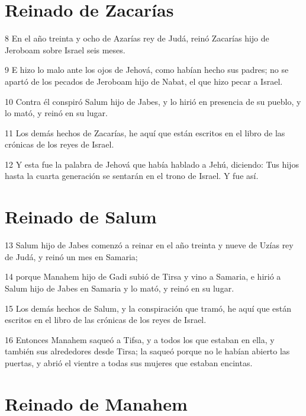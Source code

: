 \section*{Reinado de Zacarías}

\par 8 En el año treinta y ocho de Azarías rey de Judá, reinó Zacarías hijo de Jeroboam sobre Israel seis meses.
\par 9 E hizo lo malo ante los ojos de Jehová, como habían hecho sus padres; no se apartó de los pecados de Jeroboam hijo de Nabat, el que hizo pecar a Israel.
\par 10 Contra él conspiró Salum hijo de Jabes, y lo hirió en presencia de su pueblo, y lo mató, y reinó en su lugar.
\par 11 Los demás hechos de Zacarías, he aquí que están escritos en el libro de las crónicas de los reyes de Israel.
\par 12 Y esta fue la palabra de Jehová que había hablado a Jehú, diciendo: Tus hijos hasta la cuarta generación se sentarán en el trono de Israel. Y fue así.

\section*{Reinado de Salum}

\par 13 Salum hijo de Jabes comenzó a reinar en el año treinta y nueve de Uzías rey de Judá, y reinó un mes en Samaria;
\par 14 porque Manahem hijo de Gadi subió de Tirsa y vino a Samaria, e hirió a Salum hijo de Jabes en Samaria y lo mató, y reinó en su lugar.
\par 15 Los demás hechos de Salum, y la conspiración que tramó, he aquí que están escritos en el libro de las crónicas de los reyes de Israel.
\par 16 Entonces Manahem saqueó a Tifsa, y a todos los que estaban en ella, y también sus alrededores desde Tirsa; la saqueó porque no le habían abierto las puertas, y abrió el vientre a todas sus mujeres que estaban encintas.

\section*{Reinado de Manahem}

